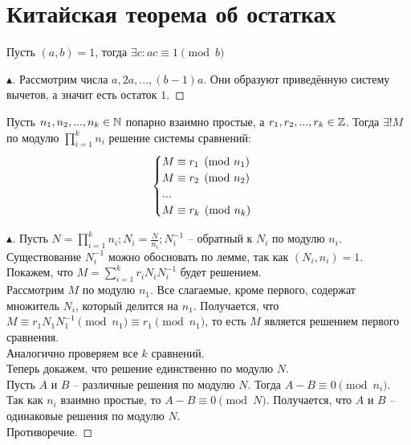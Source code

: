 \setcounter{section}{48}
\section{Китайская теорема об остатках}
\begin{lemma}
    Пусть $(a, b) = 1$, тогда $\exists c: ac \equiv 1 \pmod b$
    \begin{proof}[$\blacktriangle$]
        Рассмотрим числа $a, 2a, ..., (b-1)a$. Они образуют приведённую систему вычетов, а значит есть остаток $1$.
    \end{proof}
\end{lemma}

\begin{theorem}
    Пусть $n_1, n_2, ..., n_k \in \mathbb{N}$ попарно взаимно простые, а $r_1, r_2, ..., r_k \in \mathbb{Z}$. Тогда $\exists ! M$ по модулю $\prod \limits_{i=1}^k n_i$ решение системы сравнений:\\
    $$\begin{cases}
        M \equiv r_1 \pmod {n_1}\\
        M \equiv r_2 \pmod {n_2}\\
        ...\\
        M \equiv r_k \pmod {n_k}\\
    \end{cases}\\$$
    \begin{proof}[$\blacktriangle$]
        Пусть $N = \prod \limits_{i=1}^k n_i; N_i = \frac{N}{n_i}; N_i^{-1}$ -- обратный к $N_i$ по модулю $n_i$.\\
        Существование $N_i^{-1}$ можно обосновать по лемме, так как $(N_i, n_i) = 1$.\\
        Покажем, что $M = \sum \limits_{i=1}^{k} r_i N_i N_i^{-1}$ будет решением.\\
        Рассмотрим $M$ по модулю $n_1$. Все слагаемые, кроме первого, содержат множитель $N_i$, который делится на $n_1$. Получается, что $M \equiv r_1 N_1 N_1^{-1} \pmod{n_1} \equiv r_1 \pmod {n_1}$, то есть $M$ является решением первого сравнения.\\
        Аналогично проверяем все $k$ сравнений.\\
        Теперь докажем, что решение единственно по модулю $N$.\\
        Пусть $A$ и $B$ -- различные решения по модулю $N$. Тогда $A - B \equiv 0 \pmod{n_i}$. Так как $n_i$ взаимно простые, то $A - B \equiv 0 \pmod{N}$. Получается, что $A$ и $B$ -- одинаковые решения по модулю $N$.\\
        Противоречие.
    \end{proof}
\end{theorem}